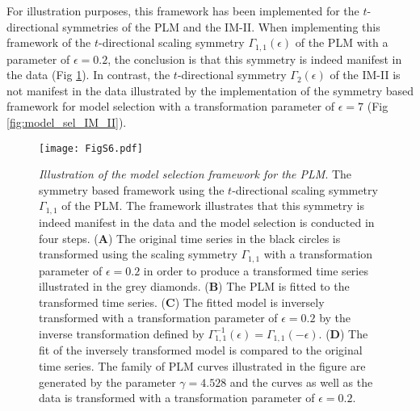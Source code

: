 For illustration purposes, this framework has been implemented for the $t$-directional symmetries of the PLM  and the IM-II. When implementing this framework of the $t$-directional scaling symmetry $\Gamma_{1,1}(\epsilon)$ of the PLM with a parameter of $\epsilon=0.2$, the conclusion is that this symmetry is indeed manifest in the data (Fig \ref{fig:model_sel_PLM}). In contrast, the $t$-directional symmetry $\Gamma_{2}(\epsilon)$ of the IM-II is not manifest in the data illustrated by the implementation of the symmetry based framework for model selection with a transformation parameter of $\epsilon=7$ (Fig \ref{fig:model_sel_IM_II}). 







\begin{figure}[htbp!]
\texttt{[image: FigS6.pdf]}
\caption[Illustration of the model selection framework for the PLM]{\textit{Illustration of the model selection framework for the PLM}. The symmetry based framework using the $t$-directional scaling symmetry $\Gamma_{1,1}$ of the PLM. The framework illustrates that this symmetry is indeed manifest in the data and the model selection is conducted in four steps. (\textbf{A}) The original time series in the black circles is transformed using the scaling symmetry $\Gamma_{1,1}$ with a transformation parameter of $\epsilon=0.2$ in order to produce a transformed time series illustrated in the grey diamonds. (\textbf{B}) The PLM is fitted to the transformed time series. (\textbf{C}) The fitted model is inversely transformed with a transformation parameter of $\epsilon=0.2$ by the inverse transformation defined by $\Gamma^{-1}_{1,1}(\epsilon)=\Gamma_{1,1}(-\epsilon)$. (\textbf{D}) The fit of the inversely transformed model is compared to the original time series. The family of PLM curves illustrated in the figure are generated by the parameter $\gamma=4.528$ and the curves as well as the data is transformed with a transformation parameter of $\epsilon=0.2$.}
\label{fig:model_sel_PLM}
\end{figure}












